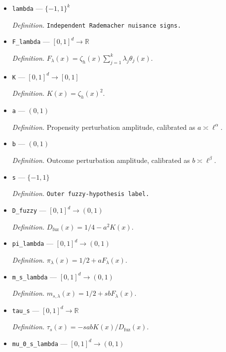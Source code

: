 \documentclass{article}
\begin{document}
\begin{itemize}
  \par\smallskip\noindent\emph{Definition.} A bounded-overlap scale-\(\ell\) squared partition of unity satisfying \(\sum_j\theta_j^2=1\) near \(\operatorname{supp}(\zeta_h)\).
  \item \texttt{lambda} --- \(\{-1,1\}^k\)
  \par\smallskip\noindent\emph{Definition.} \texttt{Independent Rademacher nuisance signs.}
  \item \texttt{F\_\allowbreak{}lambda} --- \([0,1]^d\to\mathbb R\)
  \par\smallskip\noindent\emph{Definition.} \(F_\lambda(x)=\zeta_h(x)\sum_{j=1}^k\lambda_j\theta_j(x)\).
  \item \texttt{K} --- \([0,1]^d\to[0,1]\)
  \par\smallskip\noindent\emph{Definition.} \(K(x)=\zeta_h(x)^2\).
  \item \texttt{a} --- \((0,1)\)
  \par\smallskip\noindent\emph{Definition.} Propensity perturbation amplitude, calibrated as \(a\asymp\ell^\alpha\).
  \item \texttt{b} --- \((0,1)\)
  \par\smallskip\noindent\emph{Definition.} Outcome perturbation amplitude, calibrated as \(b\asymp\ell^\beta\).
  \item \texttt{s} --- \(\{-1,1\}\)
  \par\smallskip\noindent\emph{Definition.} \texttt{Outer fuzzy-\allowbreak{}hypothesis label.}
  \item \texttt{D\_\allowbreak{}fuzzy} --- \([0,1]^d\to(0,1)\)
  \par\smallskip\noindent\emph{Definition.} \(D_{\mathrm{fuz}}(x)=1/4-a^2K(x)\).
  \item \texttt{pi\_\allowbreak{}lambda} --- \([0,1]^d\to(0,1)\)
  \par\smallskip\noindent\emph{Definition.} \(\pi_\lambda(x)=1/2+aF_\lambda(x)\).
  \item \texttt{m\_\allowbreak{}s\_\allowbreak{}lambda} --- \([0,1]^d\to(0,1)\)
  \par\smallskip\noindent\emph{Definition.} \(m_{s,\lambda}(x)=1/2+sbF_\lambda(x)\).
  \item \texttt{tau\_\allowbreak{}s} --- \([0,1]^d\to\mathbb R\)
  \par\smallskip\noindent\emph{Definition.} \(\tau_s(x)=-sabK(x)/D_{\mathrm{fuz}}(x)\).
  \item \texttt{mu\_\allowbreak{}0\_\allowbreak{}s\_\allowbreak{}lambda} --- \([0,1]^d\to(0,1)\)

\end{itemize}
\end{document}
